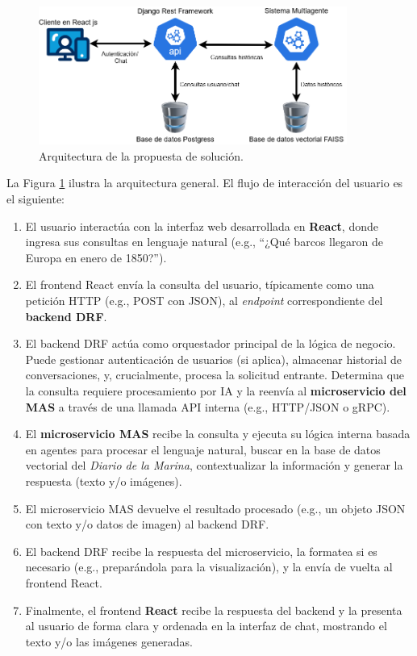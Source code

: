 \begin{figure}[htbp] %
	\centering
	\includegraphics[width=0.9\textwidth]{images/micro.png} 
	\caption{Arquitectura de la propuesta de solución.}
	\label{fig:arquitectura_web}
\end{figure}

La Figura \ref{fig:arquitectura_web} ilustra la arquitectura general. El flujo de interacción del usuario es el siguiente:

\begin{enumerate}
	\item El usuario interactúa con la interfaz web desarrollada en \textbf{React}, donde ingresa sus consultas en lenguaje natural (e.g., “¿Qué barcos llegaron de Europa en enero de 1850?”).
	\item El frontend React envía la consulta del usuario, típicamente como una petición HTTP (e.g., POST con JSON), al \textit{endpoint} correspondiente del \textbf{backend DRF}.
	\item El backend DRF actúa como orquestador principal de la lógica de negocio. Puede gestionar autenticación de usuarios (si aplica), almacenar historial de conversaciones, y, crucialmente, procesa la solicitud entrante. Determina que la consulta requiere procesamiento por IA y la reenvía al \textbf{microservicio del MAS} a través de una llamada API interna (e.g., HTTP/JSON o gRPC).
	\item El \textbf{microservicio MAS} recibe la consulta y ejecuta su lógica interna basada en agentes para procesar el lenguaje natural, buscar en la base de datos vectorial del \textit{Diario de la Marina}, contextualizar la información y generar la respuesta (texto y/o imágenes).
	\item El microservicio MAS devuelve el resultado procesado (e.g., un objeto JSON con texto y/o datos de imagen) al backend DRF.
	\item El backend DRF recibe la respuesta del microservicio, la formatea si es necesario (e.g., preparándola para la visualización), y la envía de vuelta al frontend React.
	\item Finalmente, el frontend \textbf{React} recibe la respuesta del backend y la presenta al usuario de forma clara y ordenada en la interfaz de chat, mostrando el texto y/o las imágenes generadas.
\end{enumerate}

